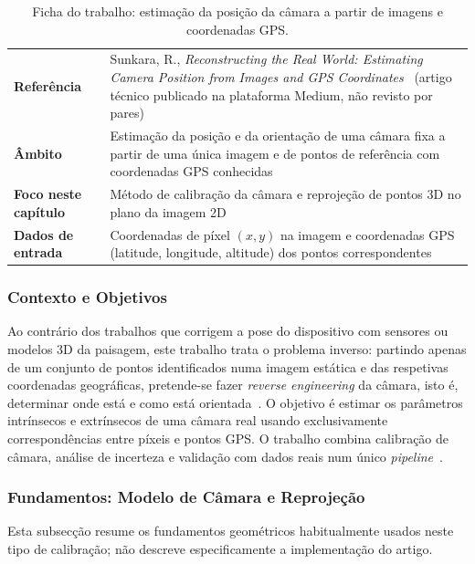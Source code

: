 \begin{table}[htbp]
\centering
\caption{Ficha do trabalho: estimação da posição da câmara a partir de imagens e coordenadas GPS.}
\label{tab:ficha_sunkara}
\small
\begin{tabular}{p{3.2cm}p{9.8cm}}
\hline
\textbf{Referência} & Sunkara, R., \textit{Reconstructing the Real World: Estimating Camera Position from Images and GPS Coordinates}~\cite{sunkara2025} (artigo técnico publicado na plataforma Medium, não revisto por pares) \\
\textbf{Âmbito} & Estimação da posição e da orientação de uma câmara fixa a partir de uma única imagem e de pontos de referência com coordenadas GPS conhecidas \\
\textbf{Foco neste capítulo} & Método de calibração da câmara e reprojeção de pontos 3D no plano da imagem 2D \\
\textbf{Dados de entrada} & Coordenadas de píxel $(x, y)$ na imagem e coordenadas GPS (latitude, longitude, altitude) dos pontos correspondentes \\
\hline
\end{tabular}
\end{table}

\subsubsection{Contexto e Objetivos}

Ao contrário dos trabalhos que corrigem a pose do dispositivo com sensores ou modelos 3D da paisagem, este trabalho trata o problema inverso: partindo apenas de um conjunto de pontos identificados numa imagem estática e das respetivas coordenadas geográficas, pretende-se fazer \textit{reverse engineering} da câmara, isto é, determinar onde está e como está orientada~\cite{sunkara2025}. O objetivo é estimar os parâmetros intrínsecos e extrínsecos de uma câmara real usando exclusivamente correspondências entre píxeis e pontos GPS. O trabalho combina calibração de câmara, análise de incerteza e validação com dados reais num único \textit{pipeline}~\cite{sunkara2025}.

\subsubsection{Fundamentos: Modelo de Câmara e Reprojeção}
\label{sec:fundamentos_reprojecao}

Esta subsecção resume os fundamentos geométricos habitualmente usados neste tipo de calibração; não descreve especificamente a implementação do artigo.

